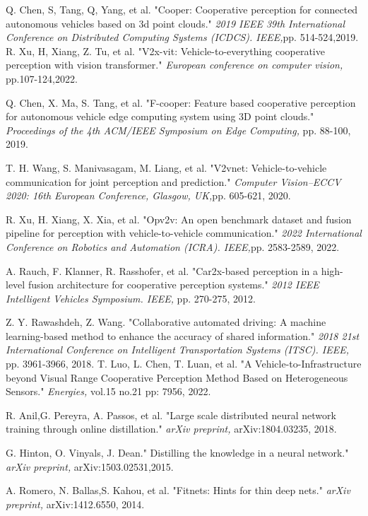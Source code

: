 \documentclass[lettersize,journal]{IEEEtran}
\begin{document}
\begin{thebibliography}{1}
Q. Chen, S, Tang, Q, Yang, et al. "Cooper: Cooperative perception for connected autonomous vehicles based on 3d point clouds." {\it{2019 IEEE 39th International Conference on Distributed Computing Systems (ICDCS). IEEE,}}pp. 514-524,2019.
R. Xu, H, Xiang, Z. Tu, et al. "V2x-vit: Vehicle-to-everything cooperative perception with vision transformer."{\it{  European conference on computer vision,}} pp.107-124,2022.


Q. Chen, X. Ma, S. Tang, et al. "F-cooper: Feature based cooperative perception for autonomous vehicle edge computing system using 3D point clouds." {\it{Proceedings of the 4th ACM/IEEE Symposium on Edge Computing,}} pp. 88-100, 2019.

T. H. Wang, S. Manivasagam, M. Liang, et al. "V2vnet: Vehicle-to-vehicle communication for joint perception and prediction." {\it{Computer Vision–ECCV 2020: 16th European Conference, Glasgow, UK,}}pp. 605-621, 2020.

R. Xu, H. Xiang, X. Xia, et al. "Opv2v: An open benchmark dataset and fusion pipeline for perception with vehicle-to-vehicle communication." {\it{2022 International Conference on Robotics and Automation (ICRA). IEEE,}}pp. 2583-2589, 2022.

A. Rauch, F. Klanner, R. Rasshofer, et al. "Car2x-based perception in a high-level fusion architecture for cooperative perception systems." {\it{2012 IEEE Intelligent Vehicles Symposium. IEEE,}} pp. 270-275, 2012.

Z. Y. Rawashdeh, Z. Wang. "Collaborative automated driving: A machine learning-based method to enhance the accuracy of shared information." {\it{2018 21st International Conference on Intelligent Transportation Systems (ITSC). IEEE,}} pp. 3961-3966, 2018.
T. Luo, L. Chen, T. Luan, et al. "A Vehicle-to-Infrastructure beyond Visual Range Cooperative Perception Method Based on Heterogeneous Sensors." {\it{Energies,}}  vol.15 no.21 pp: 7956, 2022.



R. Anil,G. Pereyra, A. Passos, et al. "Large scale distributed neural network training through online distillation." {\it{ arXiv preprint,}} arXiv:1804.03235, 2018. 

G. Hinton, O. Vinyals, J. Dean." Distilling the knowledge in a neural network."{\it{  arXiv preprint,}} arXiv:1503.02531,2015.

A. Romero, N. Ballas,S. Kahou, et al. "Fitnets: Hints for thin deep nets." {\it{ arXiv preprint,}} arXiv:1412.6550, 2014.


\end{thebibliography}
\end{document}
